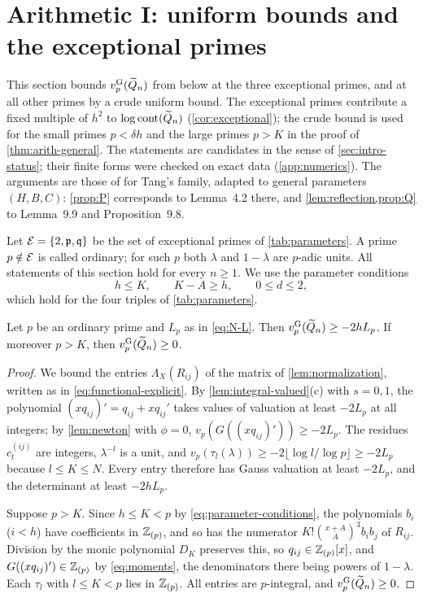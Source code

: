 \section{Arithmetic I: uniform bounds and the exceptional primes}\label{sec:exceptional}

This section bounds $v^{\mathrm{G}}_{p}(\widetilde{Q}_n)$ from below at the three exceptional primes, and at all other primes by a crude uniform bound. The exceptional primes contribute a fixed multiple of $h^2$ to $\log\operatorname{cont}(\widetilde{Q}_n)$ (\cref{cor:exceptional}); the crude bound is used for the small primes $p<\delta h$ and the large primes $p>K$ in the proof of \cref{thm:arith-general}. The statements are candidates in the sense of \cref{sec:intro-status}; their finite forms were checked on exact data (\cref{app:numerics}). The arguments are those of \cite[Sections~4.1 and 9.1--9.7]{Litsey2026Li2} for Tang's family, adapted to general parameters $(H,B,C)$: \cref{prop:P} corresponds to Lemma~4.2 there, and \cref{lem:reflection,prop:Q} to Lemma~9.9 and Proposition~9.8.

Let $\mathcal{E}=\{2,\mathfrak{p},\mathfrak{q}\}$ be the set of exceptional primes of \cref{tab:parameters}. A prime $p\notin\mathcal{E}$ is called ordinary; for such $p$ both $\lambda$ and $1-\lambda$ are $p$-adic units. All statements of this section hold for every $n\ge1$. We use the parameter conditions
\begin{equation}\label{eq:parameter-conditions}
h\le K,\qquad K-A\ge h,\qquad 0\le d\le 2,
\end{equation}
which hold for the four triples of \cref{tab:parameters}.

\begin{proposition}\label{prop:generic}
Let $p$ be an ordinary prime and $L_p$ as in \eqref{eq:N-L}. Then $v^{\mathrm{G}}_{p}(\widetilde{Q}_n)\ge-2hL_p$. If moreover $p>K$, then $v^{\mathrm{G}}_{p}(\widetilde{Q}_n)\ge0$.
\end{proposition}

\begin{proof}
We bound the entries $\Lambda_X(R_{ij})$ of the matrix of \cref{lem:normalization}, written as in \eqref{eq:functional-explicit}. By \cref{lem:integral-valued}(c) with $s=0,1$, the polynomial $(xq_{ij})'=q_{ij}+xq_{ij}'$ takes values of valuation at least $-2L_p$ at all integers; by \cref{lem:newton} with $\phi=0$, $v_p(G((xq_{ij})'))\ge-2L_p$. The residues $c^{(ij)}_l$ are integers, $\lambda^{-l}$ is a unit, and $v_p(\tau_l(\lambda))\ge-2\lfloor\log l/\log p\rfloor\ge-2L_p$ because $l\le K\le N$. Every entry therefore has Gauss valuation at least $-2L_p$, and the determinant at least $-2hL_p$.

Suppose $p>K$. Since $h\le K<p$ by \eqref{eq:parameter-conditions}, the polynomials $b_i$ ($i<h$) have coefficients in $\mathbb{Z}_{(p)}$, and so has the numerator $K!\binom{x+A}A^3b_ib_j$ of $R_{ij}$. Division by the monic polynomial $D_K$ preserves this, so $q_{ij}\in\mathbb{Z}_{(p)}[x]$, and $G((xq_{ij})')\in\mathbb{Z}_{(p)}$ by \eqref{eq:moments}, the denominators there being powers of $1-\lambda$. Each $\tau_l$ with $l\le K<p$ lies in $\mathbb{Z}_{(p)}$. All entries are $p$-integral, and $v^{\mathrm{G}}_{p}(\widetilde{Q}_n)\ge0$.
\end{proof}

